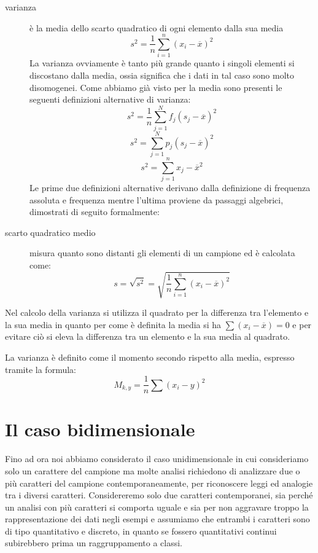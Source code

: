 \documentclass[a4paper,12pt, oneside]{book}
\begin{document}
\begin{description}
        \item [varianza] è la media dello scarto quadratico di ogni elemento dalla sua media 
                \[ s^2 = \frac{1}{n} \sum _{i = 1} ^ n (x_i - \overline{x})^2 \]
                La varianza ovviamente è tanto più grande quanto i singoli elementi si discostano dalla media, 
                ossia significa che i dati in tal caso sono molto disomogenei.
                Come abbiamo già visto per la media sono presenti le seguenti definizioni alternative di varianza:
                \[ s^2 = \frac{1}{n} \sum _{j = 1} ^ N f_j (s_j - \overline{x}) ^ 2 \]
                \[ s^2 = \sum _{j = 1} ^ N p_j (s_j - \overline{x}) ^ 2 \]
                \[ s^2 = \sum _{j = 1} ^ n x_j - \overline{x} ^ 2 \]
                Le prime due definizioni alternative derivano dalla definizione di frequenza assoluta e frequenza 
                mentre l'ultima proviene da passaggi algebrici, dimostrati di seguito formalmente:

    \item [scarto quadratico medio] misura quanto sono distanti gli elementi di un campione ed è calcolata come:
            \[ s = \sqrt{s^2} = \sqrt{\frac{1}{n} \sum _{i = 1} ^ n (x_i - \overline{x}) ^ 2} \]
\end{description}
Nel calcolo della varianza si utilizza il quadrato per la differenza tra l'elemento e la sua media in quanto 
per come è definita la media si ha $\sum (x_i - \overline{x}) = 0$ e per evitare ciò si eleva la differenza 
tra un elemento e la sua media al quadrato.

La varianza è definito come il momento secondo rispetto alla media, espresso tramite la formula:
\[ M_{k,y}=\frac{1}{n}\sum (x_i-y)^2 \]

\section{Il caso bidimensionale}
Fino ad ora noi abbiamo considerato il caso unidimensionale in cui consideriamo solo un carattere del campione ma 
 molte analisi richiedono di analizzare due o più caratteri del campione contemporaneamente, per riconoscere  
leggi ed analogie tra i diversi caratteri.\newline
Considereremo solo due caratteri contemporanei, sia perché un analisi con più caratteri si comporta uguale e sia 
per non aggravare troppo la rappresentazione dei dati negli esempi e assumiamo che entrambi i caratteri sono di
tipo quantitativo e discreto, in quanto se fossero quantitativi continui subirebbero prima un raggruppamento a classi.
\end{document}
